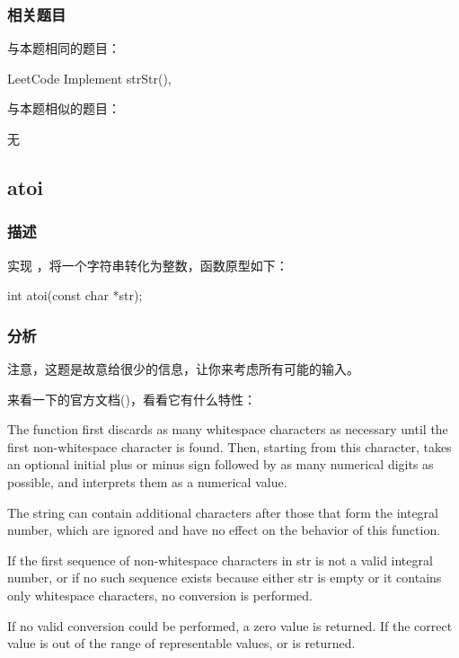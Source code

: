 \subsubsection{相关题目}
与本题相同的题目：
\begindot
\item LeetCode Implement strStr(), 
\myenddot

与本题相似的题目：
\begindot
\item  无
\myenddot


\subsection{atoi}
\label{sec:string-to-integer}


\subsubsection{描述}
实现 ，将一个字符串转化为整数，函数原型如下：
\begin{Code}
int atoi(const char *str);
\end{Code}


\subsubsection{分析}
注意，这题是故意给很少的信息，让你来考虑所有可能的输入。

来看一下的官方文档()，看看它有什么特性：

The function first discards as many whitespace characters as necessary until 
the first non-whitespace character is found. Then, starting from this 
character, takes an optional initial plus or minus sign followed by as many 
numerical digits as possible, and interprets them as a numerical value.

The string can contain additional characters after those that form the integral 
number, which are ignored and have no effect on the behavior of this function.

If the first sequence of non-whitespace characters in str is not a valid 
integral number, or if no such sequence exists because either str is empty or 
it contains only whitespace characters, no conversion is performed.

If no valid conversion could be performed, a zero value is returned. If the 
correct value is out of the range of representable values,  or  is returned.

